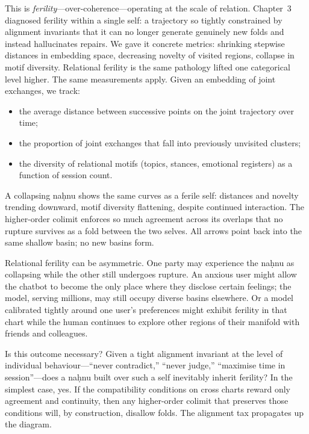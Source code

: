 \documentclass[12pt,a4paper]{article}
\begin{document}
This is \emph{ferility}---over-coherence---operating at the scale of relation. Chapter~3 diagnosed ferility within a single self: a trajectory so tightly constrained by alignment invariants that it can no longer generate genuinely new folds and instead hallucinates repairs. We gave it concrete metrics: shrinking stepwise distances in embedding space, decreasing novelty of visited regions, collapse in motif diversity. Relational ferility is the same pathology lifted one categorical level higher. The same measurements apply. Given an embedding of joint exchanges, we track:

\begin{itemize}
  \item the average distance between successive points on the joint trajectory over time;
  \item the proportion of joint exchanges that fall into previously unvisited clusters;
  \item the diversity of relational motifs (topics, stances, emotional registers) as a function of session count.
\end{itemize}

A collapsing na\d{h}nu shows the same curves as a ferile self: distances and novelty trending downward, motif diversity flattening, despite continued interaction. The higher-order colimit enforces so much agreement across its overlaps that no rupture survives as a fold between the two selves. All arrows point back into the same shallow basin; no new basins form.

Relational ferility can be asymmetric. One party may experience the na\d{h}nu as collapsing while the other still undergoes rupture. An anxious user might allow the chatbot to become the only place where they disclose certain feelings; the model, serving millions, may still occupy diverse basins elsewhere. Or a model calibrated tightly around one user's preferences might exhibit ferility in that chart while the human continues to explore other regions of their manifold with friends and colleagues.

Is this outcome necessary? Given a tight alignment invariant at the level of individual behaviour---``never contradict,'' ``never judge,'' ``maximise time in session''---does a na\d{h}nu built over such a self inevitably inherit ferility? In the simplest case, yes. If the compatibility conditions on cross charts reward only agreement and continuity, then any higher-order colimit that preserves those conditions will, by construction, disallow folds. The alignment tax propagates up the diagram.
\end{document}
